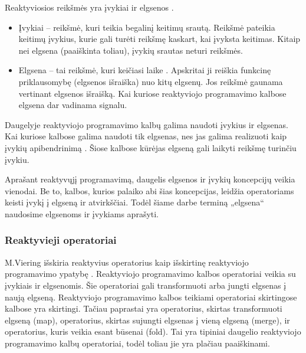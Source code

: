 Reaktyviosios reikšmės yra įvykiai ir elgsenos \cite{Bainomugisha:2013:SRP:2501654.2501666}.

\begin{itemize}
  \item Įvykiai – reikšmė, kuri teikia begalinį keitimų srautą. Reikšmė pateikia keitimų įvykius, kurie gali turėti reikšmę kaskart, kai įvyksta keitimas. Kitaip nei elgsena (paaiškinta toliau), įvykių srautas neturi reikšmės.
  \item Elgsena – tai reikšmė, kuri keičiasi laike \cite{ElliottHudak97:Fran}. Apskritai ji reiškia funkcinę priklausomybę (elgsenos išraiška) nuo kitų elgsenų. Jos reikšmė gaunama vertinant elgsenos išraišką. Kai kuriose reaktyviojo programavimo kalbose elgsena dar vadinama signalu.
\end{itemize}

Daugelyje reaktyviojo programavimo kalbų galima naudoti įvykius ir elgsenas. Kai kuriose kalbose galima naudoti tik elgsenas, nes jas galima realizuoti kaip įvykių apibendrinimą \cite{Wan2002:EventDrivenFRP, CzaplickiC13:FRPGUI}. Šiose kalbose kūrėjas elgseną gali laikyti reikšmę turinčiu įvykiu.

Aprašant reaktyvųjį programavimą, daugelis elgsenos ir įvykių koncepcijų veikia vienodai. Be to, kalbos, kurios palaiko abi šias koncepcijas, leidžia operatoriams keisti įvykį į elgseną ir atvirkščiai. Todėl šiame darbe terminą „elgsena“ naudosime elgsenoms ir įvykiams aprašyti.

\subsubsection{Reaktyvieji operatoriai}

M.Viering išskiria reaktyvius operatorius kaip išskirtinę reaktyviojo programavimo ypatybę \cite{RubyReactiveMaster}. Reaktyviojo programavimo kalbos operatoriai veikia su įvykiais ir elgsenomis. Šie operatoriai gali transformuoti arba jungti elgsenas į naują elgseną. Reaktyviojo programavimo kalbos teikiami operatoriai skirtingose kalbose yra skirtingi. Tačiau paprastai yra operatorius, skirtas transformuoti elgseną (map), operatorius, skirtas sujungti elgsenas į vieną elgseną (merge), ir operatorius, kuris veikia esant būsenai (fold). Tai yra tipiniai daugelio reaktyviojo programavimo kalbų operatoriai, todėl toliau jie yra plačiau paaiškinami.

